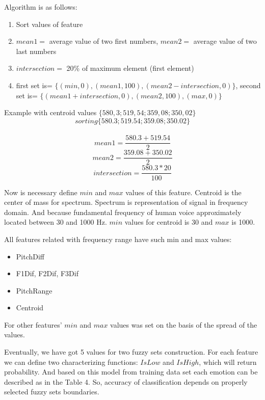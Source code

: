 \documentclass[14pt]{extarticle}
\begin{document}
Algorithm is as follows:

\begin{enumerate}
	\item Sort values of feature
	\item $mean1=$ average value of two first numbers, $mean2=$ average value of two last numbers
	\item $intersection=$ 20\% of maximum element (first element)
	\item first set is= $\{ (min,0) , (mean1, 100) , (mean2-intersection, 0) \}$, second set is= $\{ (mean1+intersection, 0), (mean2, 100) , (max, 0) \}$
\end{enumerate}

Example with centroid values $\{580,3;519,54;359,08;350,02\}$\\
\[ sorting    \{580.3;519.54;359.08;350.02\} \]\\
\[ mean1=\frac{580.3+519.54}{2} \]
\[ mean2=\frac{359.08+350.02}{2}\]
\[intersection=\frac{580.3*20}{100}\]

Now is necessary define $min$ and $max$ values of this feature. Centroid is the center of mass for spectrum. Spectrum is representation of signal in frequency domain. And because fundamental frequency of human voice approximately  located between 30 and 1000 Hz. $min$ values for centroid is 30 and $max$ is 1000.

All features related with frequency range have such min and max values:
\begin{itemize}
	\item PitchDiff
	\item F1Dif, F2Dif, F3Dif
	\item PitchRange
	\item Centroid
\end{itemize}
For other features' $min$ and $max$ values was set on the basis of the spread of the values.

Eventually, we have got 5 values for two fuzzy sets construction. For each feature we can define two characterizing functions: $IsLow$ and $IsHigh$, which will return probability. And based on this model from training data set each emotion can be described as in the Table 4. So, accuracy of classification depends on properly selected fuzzy sets boundaries.
\end{document}
